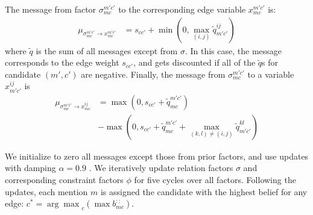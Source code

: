 The message from factor $\sigma_{mc}^{m'c'}$ to the corresponding edge variable $x_{mc}^{m'c'}$  is:
\begin{align}
\mu_{\sigma_{mc}^{m'c'} \rightarrow x_{mc}^{m'c'}} &= s_{cc'} + \min(0, \max_{(i, j)} \tilde{q}_{m'c'}^{ij} )
\end{align}
where $\tilde{q}$ is the sum of all messages except from $\sigma$. In this case, the message corresponds to the edge weight $s_{cc'}$, and gets discounted if all of the $\tilde{q}$s for candidate $(m', c')$ are negative. Finally, the message from $\sigma_{mc}^{m'c'}$ to a variable $x_{m'c'}^{ij}$ is
\begin{align}
\mu_{\sigma_{mc}^{m'c'} \rightarrow x_{mc}^{ij}} &= \max(0, s_{cc'} + \tilde{q}_{mc}^{m'c'}) \\ 
 &- \max (0, s_{cc'} + \tilde{q}_{mc}^{m'c'} + \max_{(k,l) \neq (i, j)} \tilde{q}_{m'c'}^{kl}  ) \nonumber
\end{align}

We initialize to zero all messages except those from prior factors, and use updates with damping $\alpha=0.9$ .  We iteratively update relation factors $\sigma$ and corresponding constraint factors $\phi$ for five cycles over all factors. Following the updates, each mention $m$ is assigned the candidate with the highest belief for any edge: $c^* = {\arg \max}_{c} (\max b_{mc}^{::})$.


